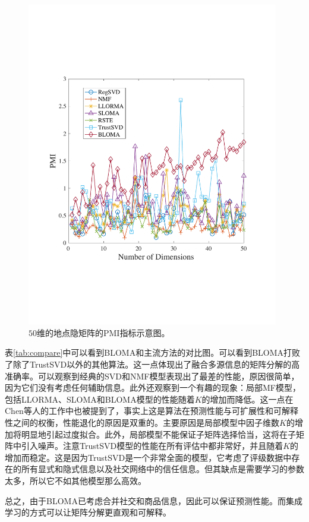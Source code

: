 \begin{figure}[!thb]
\centering
\includegraphics[width=110mm]{pics/pmi.pdf}
\caption{$50$维的地点隐矩阵的PMI指标示意图。} 
\label{pmi}
\end{figure}


表\ref{tab:compare}中可以看到BLOMA和主流方法的对比图。可以看到BLOMA打败了除了TrustSVD以外的其他算法。这一点体现出了融合多源信息的矩阵分解的高准确率。可以观察到经典的SVD和NMF模型表现出了最差的性能，原因很简单，因为它们没有考虑任何辅助信息。此外还观察到一个有趣的现象：局部MF模型，包括LLORMA、SLOMA和BLOMA模型的性能随着$K$的增加而降低。这一点在Chen等人的工作中也被提到了，事实上这是算法在预测性能与可扩展性和可解释性之间的权衡，性能退化的原因是双重的。主要原因是局部模型中因子维数$K$的增加将明显地引起过度拟合。此外，局部模型不能保证子矩阵选择恰当，这将在子矩阵中引入噪声。注意TrustSVD模型的性能在所有评估中都非常好，并且随着$ K $的增加而稳定。这是因为TrustSVD是一个非常全面的模型，它考虑了评级数据中存在的所有显式和隐式信息以及社交网络中的信任信息。但其缺点是需要学习的参数太多，所以它不如其他模型那么高效。

总之，由于BLOMA已考虑合并社交和商品信息，因此可以保证预测性能。而集成学习的方式可以让矩阵分解更直观和可解释。


